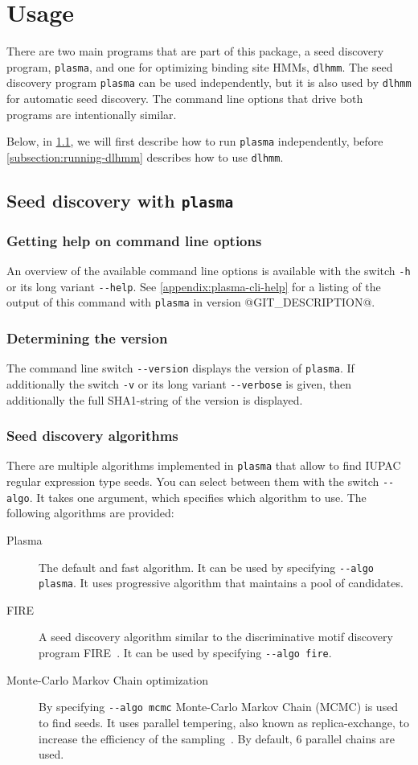 \documentclass[a4paper]{article}
\makeatletter
\newcommand{\plasma}[0]{\texttt{plasma}}
\newcommand{\dlhmm}[0]{\texttt{dlhmm}}
\newcommand{\version}[0]{@GIT_DESCRIPTION@}
\makeatother
\begin{document}
\section{Usage}
There are two main programs that are part of this package, a seed discovery program, \plasma{}, and one for optimizing binding site HMMs, \dlhmm{}.
The seed discovery program \plasma{} can be used independently, but it is also used by \dlhmm{} for automatic seed discovery.
The command line options that drive both programs are intentionally similar.

Below, in \cref{subsection:running-plasma}, we will first describe how to run \plasma{} independently, before \cref{subsection:running-dlhmm} describes how to use \dlhmm{}.

\subsection{Seed discovery with \plasma{}}
\label{subsection:running-plasma}
\subsubsection{Getting help on command line options}
An overview of the available command line options is available with the switch \verb|-h| or its long variant \verb|--help|.
See \cref{appendix:plasma-cli-help} for a listing of the output of this command with \plasma{} in version \version{}.
\subsubsection{Determining the version}
The command line switch \verb|--version| displays the version of \plasma{}.
If additionally the switch \verb|-v| or its long variant \verb|--verbose| is given, then additionally the full SHA1-string of the version is displayed.

\subsubsection{Seed discovery algorithms}
There are multiple algorithms implemented in \plasma{} that allow to find IUPAC regular expression type seeds.
You can select between them with the switch \verb|--algo|.
It takes one argument, which specifies which algorithm to use.
The following algorithms are provided:
\begin{description}
  \item[Plasma]
    The default and fast algorithm.
    It can be used by specifying \verb|--algo plasma|.
    It uses progressive algorithm that maintains a pool of candidates.
  \item[FIRE]
    A seed discovery algorithm similar to the discriminative motif discovery program FIRE~\cite{Elemento2007}.
    It can be used by specifying \verb|--algo fire|.
  \item[Monte-Carlo Markov Chain optimization]
    By specifying \verb|--algo mcmc| Monte-Carlo Markov Chain (MCMC) is used to find seeds.
    It uses parallel tempering, also known as replica-exchange, to increase the efficiency of the sampling~\cite{Earl2005}.
    By default, 6 parallel chains are used.
\end{description}
\end{document}
